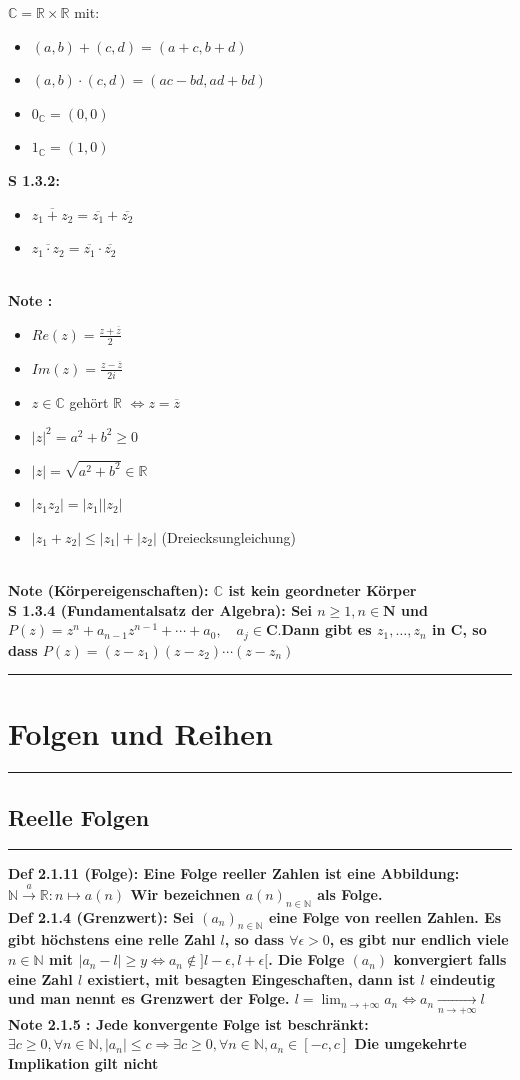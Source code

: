 \documentclass[7pt,landscape, margin = 0.1mm]{article}
\newcommand{\titellinie}{\rule{1.\linewidth}{0.75pt}}
\newcommand*{\mysection}[2][black]{\vskip 0pt \titellinie\vspace{-20pt}\section{#2}\vspace{-14pt}\titellinie \colorlet{chaptecolor}{#1}}
\newcommand*{\mysubsection}[1]{\vspace{-2mm}\color{chaptercolor}\subsection{ #1 }
\vspace{-1mm}\hrule\vspace{1.5mm}\color{black}
\vspace{2mm}}
\newcommand{\DEF}[2]{\color{chaptercolor}\bf{Def #1}:\color{black}    \hspace{0.2cm} #2 \\}
\newcommand{\NOTE}[2]{\color{chaptercolor}\bf{Note #1}:\color{black}    \hspace{0.2cm} #2 \\}
\newcommand{\SA}[2]{\color{chaptercolor}\bf{S #1}:\color{black}    \hspace{0.2cm} #2 \\}
\begin{document}
\begin{multicols}{4}
\begin{flushleft}
{$\mathbb{C} = \mathbb{R} \times \mathbb{R}$ mit:
\begin{itemize}
\item $(a,b) + (c,d) = (a+c, b+d)$
\item $(a,b) \cdot (c,d) = (ac-bd, ad+bd)$
\item $0_{\mathbb{C}} = (0,0)$
\item $1_{\mathbb{C}} = (1,0)$ \end{itemize}}
\SA{1.3.2}{\begin{itemize}
\item  $\overline{z_1 + z_2 }= \overline{z_1} + \overline{z_2}$
\item $\overline{z_1 \cdot z_2 }= \overline{z_1} \cdot \overline{z_2}$
\end{itemize}}
\NOTE{}{\begin{itemize}
\item $Re(z) = \frac{z+\overline{z}}{2}$
\item$Im(z) = \frac{z -\overline{z}}{2i}$
\item $z \in \mathbb{C}$ gehört $\mathbb{R}$ $\Leftrightarrow z = \overline{z}$
\item $|z|^2 = a^2 + b^2 \geq 0$
\item $|z| = \sqrt{a^2 + b^2} \in \mathbb{R}$
\item $|z_1 z_2| = |z_1||z_2|$
\item $|z_1 + z_2| \leq |z_1| + |z_2|$ (Dreiecksungleichung)
\end{itemize}}
\NOTE{(Körpereigenschaften)}{$\mathbb{C}$ ist kein geordneter Körper}
\SA{1.3.4 (Fundamentalsatz der Algebra)}{ Sei $n \geqslant 1, n \in \mathbf{N}$ und$
P(z)=z^n+a_{n-1} z^{n-1}+\cdots+a_0, \quad a_j \in \mathbf{C} .
$Dann gibt es $z_1, \ldots, z_n$ in $\mathbf{C}$, so dass
$
P(z)=\left(z-z_1\right)\left(z-z_2\right) \cdots\left(z-z_n\right)
$}
\mysection[green]{\centering Folgen und Reihen}
\mysubsection{Reelle Folgen}
\DEF{2.1.11 (Folge)}{Eine Folge reeller Zahlen ist eine Abbildung:$ \mathbb{N} \overset{a}{\rightarrow} \mathbb{R}: n \mapsto a(n) $ Wir bezeichnen $a(n)_{n \in \mathbb{N}}$ als Folge.}
\DEF{2.1.4 (Grenzwert)}{
Sei $(a_n)_{n \in \mathbb{N}}$ eine Folge von reellen Zahlen. Es gibt höchstens eine relle Zahl $l$, so dass $\forall \epsilon >0$, es gibt nur endlich viele $n \in \mathbb{N}$ mit $|a_n -l| \geq y \Leftrightarrow a_n \notin ]l-\epsilon, l+\epsilon[$. Die Folge $(a_n)$ konvergiert falls eine Zahl $l$ existiert, mit besagten Eingeschaften, dann ist $l$ eindeutig und man nennt es Grenzwert der Folge.
$ l = \lim_{n \rightarrow + \infty} a_n \Leftrightarrow a_n \underset{n \rightarrow + \infty}{\rightarrow} l $}
\NOTE{2.1.5 }{Jede konvergente Folge ist beschränkt: $\exists c \geq 0, \forall n \in \mathbb{N}, |a_n|\leq c \Rightarrow \exists c \geq 0, \forall n \in \mathbb{N}, a_n \in [-c,c]$
Die umgekehrte Implikation gilt nicht }


\end{flushleft}
\end{multicols}
\end{document}
